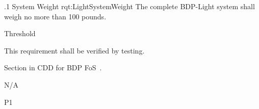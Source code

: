 




\ONERQMTVKSA
{\RqtNumberBase.1}
{System Weight}
{rqt:LightSystemWeight}
{The complete BDP-Light system shall weigh no more than 100 pounds.}
{
	\item [Phase 1] Threshold
}
{This requirement shall be verified by testing.}
{
\item [5.5.6.1] Section in CDD for BDP FoS~\cite{ref__BDP_FOS_CDD}.
}
{
	\item N/A
}
{P1}

